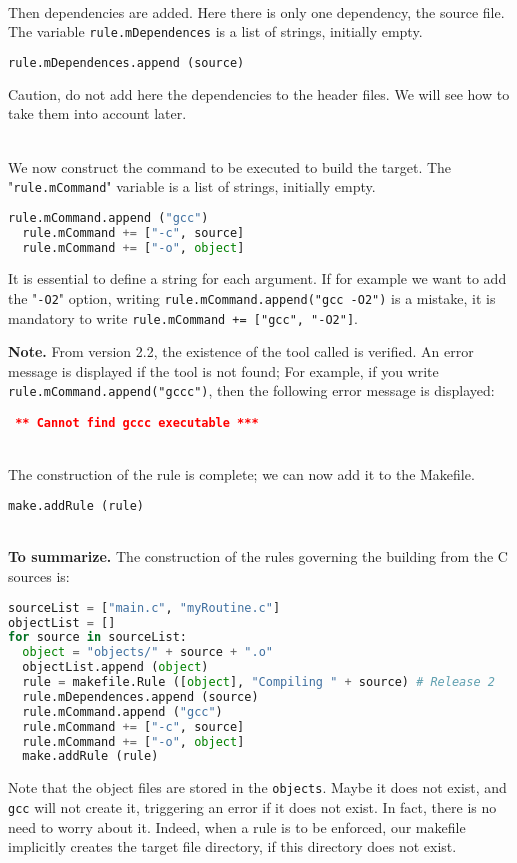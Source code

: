 \documentclass[a4paper,11pt]{extarticle}
\begin{document}
~\\Then dependencies are added. Here there is only one dependency, the source file. The variable \texttt{rule.mDependences} is a list of strings, initially empty.
\begin{lstlisting}[language=py]
  rule.mDependences.append (source)
\end{lstlisting}
Caution, do not add here the dependencies to the header files. We will see how to take them into account later.

~\\We now construct the command to be executed to build the target. The "\texttt{rule.mCommand}" variable is a list of strings, initially empty.
\begin{lstlisting}[language=py]
  rule.mCommand.append ("gcc")
  rule.mCommand += ["-c", source]
  rule.mCommand += ["-o", object]
\end{lstlisting}
It is essential to define a string for each argument. If for example we want to add the "\texttt{-O2}" option, writing \texttt{rule.mCommand.append("gcc -O2")} is a mistake, it is mandatory to write \texttt{rule.mCommand += ["gcc", "-O2"]}.

{\bf Note.}\label{verifUtilitaire}
From version 2.2, the existence of the tool called is verified. An error message is displayed if the tool is not found; For example, if you write \texttt{rule.mCommand.append("gccc")}, then the following error message is displayed:

\begin{mdframed}[hidealllines=true,backgroundcolor=lightgray!20]
\tt\footnotesize
\textcolor{red}{\bf*** Cannot find~\textquotesingle gccc\textquotesingle~executable ***}
\end{mdframed}

~\\The construction of the rule is complete; we can now add it to the Makefile.
\begin{lstlisting}[language=py]
  make.addRule (rule)
\end{lstlisting}


~\\{\bf To summarize.} The construction of the rules governing the building from the C sources is:
\begin{lstlisting}[language=py]
sourceList = ["main.c", "myRoutine.c"]
objectList = []
for source in sourceList:
  object = "objects/" + source + ".o"
  objectList.append (object)
  rule = makefile.Rule ([object], "Compiling " + source) # Release 2
  rule.mDependences.append (source)
  rule.mCommand.append ("gcc")
  rule.mCommand += ["-c", source]
  rule.mCommand += ["-o", object]
  make.addRule (rule)
\end{lstlisting}
Note that the object files are stored in the \texttt{objects}. Maybe it does not exist, and \texttt{gcc} will not create it, triggering an error if it does not exist. In fact, there is no need to worry about it. Indeed, when a rule is to be enforced, our makefile implicitly creates the target file directory, if this directory does not exist.
\end{document}

